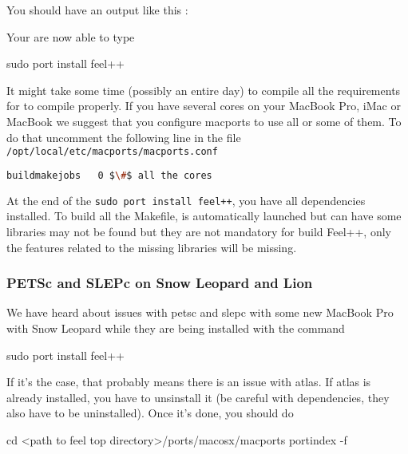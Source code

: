 You should have an output like this :
\begin{flushleft}
\end{flushleft}
Your are now able to type
\begin{unixcom}
		sudo port install feel++
\end{unixcom}
It might take some time (possibly an entire day) to compile all the requirements for \feel
to compile properly. If you have several cores on your MacBook Pro, iMac or MacBook
we suggest that you configure macports to use all or some of them.
To do that uncomment the following line in the file  \lstinline|/opt/local/etc/macports/macports.conf|
\begin{flushleft}
\begin{lstlisting}[language=sh]
buildmakejobs	0 $\#$ all the cores
\end{lstlisting}
\end{flushleft}
At the end of the \lstinline|sudo port install feel++|, you have all
dependencies installed. To build all the Makefile, \cmake is automatically
launched but can have some libraries may not be found but they are not mandatory
for build Feel++, only the features related to the missing libraries will be
missing.

\subsubsection{PETSc and SLEPc on Snow Leopard and Lion}
We have heard about issues with petsc and slepc with some new MacBook Pro with
Snow Leopard while they are being installed with the command
\begin{unixcom}
  sudo port install feel++
\end{unixcom}
If it's the case, that probably means there is an issue with
atlas. If atlas is already installed, you have to unsinstall it (be careful
with dependencies, they also have to be uninstalled). Once it's done, you should
do
\begin{unixcom}
		cd <path to feel top directory>/ports/macosx/macports
		portindex -f
\end{unixcom}

